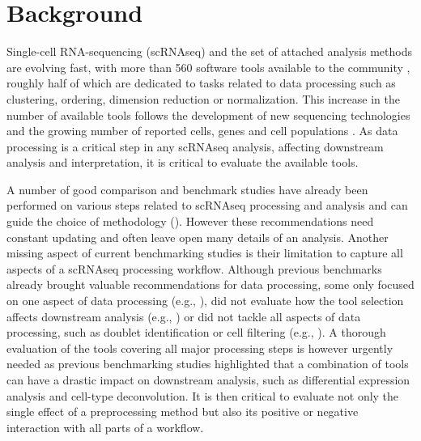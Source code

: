 \documentclass{bmcart}
\begin{document}

\section*{Background}

Single-cell RNA-sequencing (scRNAseq) and the set of attached analysis methods are evolving fast, with more than 560 software tools available to the community \cite{ZappiaDB2018}, roughly half of which are dedicated to tasks related to data processing such as clustering, ordering, dimension reduction or normalization. This increase in the number of available tools follows the development of new sequencing technologies and the growing number of reported cells, genes and cell populations \cite{SvenssonDB2019}. As data processing is a critical step in any scRNAseq analysis, affecting downstream analysis and interpretation, it is critical to evaluate the available tools.

A number of good comparison and benchmark studies have already been performed on various steps related to scRNAseq processing and analysis and can guide the choice of methodology (\citealp{CobosDeconvolution2020, colePerformance2018, DalMolinDE2017, duoClustering2018, freytagComparison2018, GaoProcessing2020, HeiserDimred2019, HouImput2020, JaakkolaDE2017, KrzakClust2019, SonesonDE2018, SunDimRed2019, tianMixology2018, TranBatch2020, TsuyuzakiPCA2020, viethSystematic2019, WangDE2019, YipHVGs2018, ZhangImput2018}). However these recommendations need constant updating and often leave open many details of an analysis. Another missing aspect of current benchmarking studies is their limitation to capture all aspects of a scRNAseq processing workflow. Although previous benchmarks already brought valuable recommendations for data processing, some only focused on one aspect of data processing (e.g., \citealp{SunDimRed2019}), did not evaluate how the tool selection affects downstream analysis (e.g., \citealp{TsuyuzakiPCA2020}) or did not tackle all aspects of data processing, such as doublet identification or cell filtering (e.g., \citealp{viethSystematic2019}). A thorough evaluation of the tools covering all major processing steps is however urgently needed as previous benchmarking studies highlighted that a combination of tools can have a drastic impact on downstream analysis, such as differential expression analysis and cell-type deconvolution\cite{viethSystematic2019,CobosDeconvolution2020}. It is then critical to evaluate not only the single effect of a preprocessing method but also its positive or negative interaction with all parts of a workflow.
\end{document}
